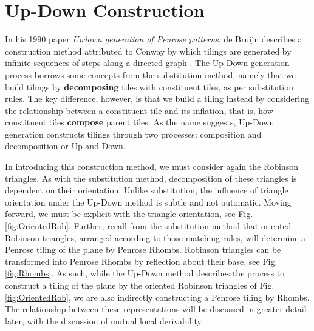 \documentclass[
  oneside,
  11pt, a4paper,
  footinclude=true,
  headinclude=true,
  cleardoublepage=empty
]{scrbook}
\begin{document}
\chapter{Up-Down Construction} %

In his 1990 paper \textit{Updown generation of Penrose patterns}, de Bruijn describes a construction method attributed to Conway by which tilings are generated by infinite sequences of steps along a directed graph \cite{DeBruijn1990}. The Up-Down generation process borrows some concepts from the substitution method, namely that we build tilings by \textbf{decomposing} tiles with constituent tiles, as per substitution rules. The key difference, however, is that we build a tiling instead by considering the relationship between a constituent tile and its inflation, that is, how constituent tiles \textbf{compose} parent tiles. As the name suggests, Up-Down generation constructs tilings through two processes: composition and decomposition or Up and Down.

In introducing this construction method, we must consider again the Robinson triangles. As with the substitution method, decomposition of these triangles is dependent on their orientation. Unlike substitution, the influence of triangle orientation under the Up-Down method is subtle and not automatic. Moving forward, we must be explicit with the triangle orientation, see Fig.\ref{fig:OrientedRob}. Further, recall from the substitution method that oriented Robinson triangles, arranged according to those matching rules, will determine a Penrose tiling of the plane by Penrose Rhombs. Robinson triangles can be transformed into Penrose Rhombs by reflection about their base, see Fig.\ref{fig:Rhombs}. As such, while the Up-Down method describes the process to construct a tiling of the plane by the oriented Robinson triangles of Fig.\ref{fig:OrientedRob}, we are also indirectly constructing a Penrose tiling by Rhombs. The relationship between these representations will be discussed in greater detail later, with the discussion of mutual local derivability. 

 
\end{document}
